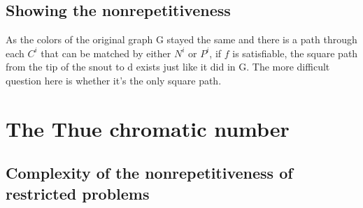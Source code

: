 \documentclass[12pt,a4paper]{article}
\begin{document}
\subsection{Showing the nonrepetitiveness}

As the colors of the original graph G stayed the same and there is a path through each $C^i$ that can be matched by either $N^i$ or $P^i$, if $f$ is satisfiable, the square path from the tip of the snout to d exists just like it did in G. The more difficult question here is whether it's the only square path.

\section{The Thue chromatic number}
\subsection{Complexity of the nonrepetitiveness of restricted problems}
\end{document}
